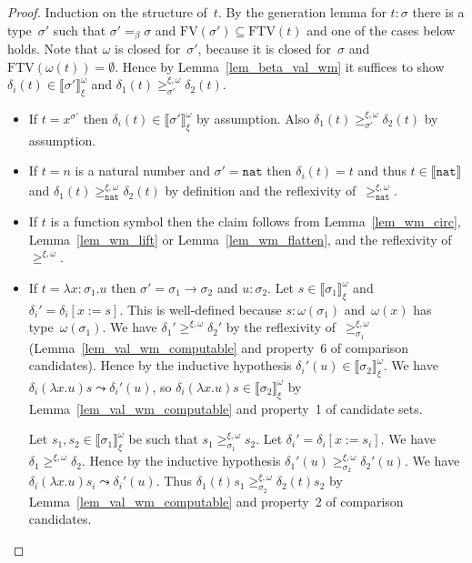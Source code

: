 \documentclass[a4paper,UKenglish,cleveref,autoref,numberwithinsect]{lipics-v2019}
\theoremstyle{definition}
\newcommand{\arrtype}{\rightarrow}
\newcommand{\subst}[2]{#1:=#2}
\newcommand{\abs}[2]{\lambda #1.#2}
\newcommand{\nat}{\mathtt{nat}}
\newcommand{\FTV}{\mathrm{FTV}}
\newcommand{\FV}{\mathrm{FV}}
\newcommand{\val}[3]{\ensuremath{\llbracket#1\rrbracket_{#2}^{#3}}}
\newcommand{\gteq}[3]{\ensuremath{\ge_{#1}^{#2,#3}}}
\begin{document}
\begin{proof}
  Induction on the structure of~$t$. By the generation lemma for $t :
  \sigma$ there is a type~$\sigma'$ such that $\sigma' =_\beta \sigma$
  and $\FV(\sigma') \subseteq \FTV(t)$ and one of the cases below
  holds. Note that $\omega$ is closed for~$\sigma'$, because it is
  closed for~$\sigma$ and $\FTV(\omega(t)) = \emptyset$. Hence by
  Lemma~\ref{lem_beta_val_wm} it suffices to show $\delta_i(t) \in
  \val{\sigma'}{\xi}{\omega}$ and $\delta_1(t)
  \gteq{\sigma'}{\xi}{\omega} \delta_2(t)$.
  \begin{itemize}
  \item If $t = x^{\sigma'}$ then $\delta_i(t) \in
    \val{\sigma'}{\xi}{\omega}$ by assumption. Also $\delta_1(t)
    \gteq{\sigma'}{\xi}{\omega} \delta_2(t)$ by assumption.
  \item If $t = n$ is a natural number and $\sigma' = \nat$ then
    $\delta_i(t) = t$ and thus $t \in \val{\nat}{}{}$ and $\delta_1(t)
    \gteq{\nat}{\xi}{\omega} \delta_2(t)$ by definition and the
    reflexivity of~$\gteq{\nat}{\xi}{\omega}$.
  \item If $t$ is a function symbol then the claim follows from
    Lemma~\ref{lem_wm_circ}, Lemma~\ref{lem_wm_lift} or
    Lemma~\ref{lem_wm_flatten}, and the reflexivity
    of~$\gteq{}{\xi}{\omega}$.
  \item If $t = \abs{x:\sigma_1}{u}$ then $\sigma' =
    \sigma_1\arrtype\sigma_2$ and $u : \sigma_2$. Let $s \in
    \val{\sigma_1}{\xi}{\omega}$ and
    $\delta_i'=\delta_i[\subst{x}{s}]$. This is well-defined because
    $s : \omega(\sigma_1)$ and~$\omega(x)$ has
    type~$\omega(\sigma_1)$. We have $\delta_1' \gteq{}{\xi}{\omega}
    \delta_2'$ by the reflexivity of~$\gteq{\sigma_1}{\xi}{\omega}$
    (Lemma~\ref{lem_val_wm_computable} and property~6 of comparison
    candidates). Hence by the inductive hypothesis $\delta_i'(u) \in
    \val{\sigma_2}{\xi}{\omega}$. We have $\delta_i(\abs{x}{u}) s
    \leadsto \delta_i'(u)$, so $\delta_i(\abs{x}{u}) s \in
    \val{\sigma_2}{\xi}{\omega}$ by Lemma~\ref{lem_val_wm_computable}
    and property~1 of candidate sets.

    Let $s_1,s_2 \in \val{\sigma_1}{\xi}{\omega}$ be such that $s_1
    \gteq{\sigma_1}{\xi}{\omega} s_2$. Let
    $\delta_i'=\delta_i[\subst{x}{s_i}]$. We have $\delta_1
    \gteq{}{\xi}{\omega} \delta_2$. Hence by the inductive hypothesis
    $\delta_1'(u)\gteq{\sigma_2}{\xi}{\omega}\delta_2'(u)$. We have
    $\delta_i(\abs{x}{u}) s_i \leadsto \delta_i'(u)$. Thus
    $\delta_1(t) s_1 \gteq{\sigma_2}{\xi}{\omega} \delta_2(t) s_2$ by
    Lemma~\ref{lem_val_wm_computable} and property~2 of comparison
    candidates.


\end{itemize}
\end{proof}
\end{document}
